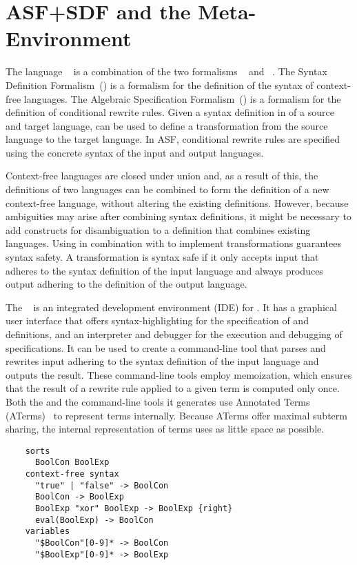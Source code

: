 \section{ASF+SDF and the Meta-Environment}
\label{sec:tools:asfsdf}

The language \ASFSDF~\cite{Deu96.asdf} is a combination of the two formalisms \ASF~\cite{AlgebraicSpecification1989} and \SDF~\cite{Vis97.thesis}.
The Syntax Definition Formalism~(\SDF) is a formalism for the definition of the syntax of context-free languages.
The Algebraic Specification Formalism~(\ASF) is a formalism for the definition of conditional rewrite rules.
Given a syntax definition in \SDF of a source and target language, \ASF can be used to define a transformation from the source language to the target language.
In ASF, conditional rewrite rules are specified using the concrete syntax of the input and output languages.

Context-free languages are closed under union and, as a result of this, the \SDF definitions of two languages can be combined to form the definition of a new context-free language, without altering the existing definitions.
However, because ambiguities may arise after combining syntax definitions, it might be necessary to add constructs for disambiguation to a definition that combines existing languages.
Using \ASF in combination with \SDF to implement transformations guarantees syntax safety.
A transformation is syntax safe if it only accepts input that adheres to the syntax definition of the input language and always produces output adhering to the definition of the output language.

The \ASFSDFME~\cite{Brand:2001:ASF} is an integrated development environment (IDE) for \ASFSDF.
It has a graphical user interface that offers syntax-highlighting for the specification of \SDF and \ASF definitions, and an interpreter and debugger for the execution and debugging of \ASF specifications.
It can be used to create a command-line tool that parses and rewrites input adhering to the syntax definition of the input language and outputs the result.
These command-line tools employ memoization, which ensures that the result of a rewrite rule applied to a given term is computed only once.
Both the \ASFSDFME and the command-line tools it generates use Annotated Terms (ATerms)~\cite{Brand:2007:AME:1219180.1219600} to represent terms internally.
Because ATerms offer maximal subterm sharing, the internal representation of terms uses as little space as possible.

\begin{listing}
  \lstset{
    language=sdf,
    label=lst:tools:asfsdf:SDF-definition,
    caption=Part of an \SDF definition that defines simple Boolean expressions,
    numbers=left
  }
  \begin{lstlisting}
    sorts
      BoolCon BoolExp
    context-free syntax
      "true" | "false" -> BoolCon
      BoolCon -> BoolExp
      BoolExp "xor" BoolExp -> BoolExp {right}
      eval(BoolExp) -> BoolCon
    variables
      "$BoolCon"[0-9]* -> BoolCon
      "$BoolExp"[0-9]* -> BoolExp
  \end{lstlisting}
\end{listing}

